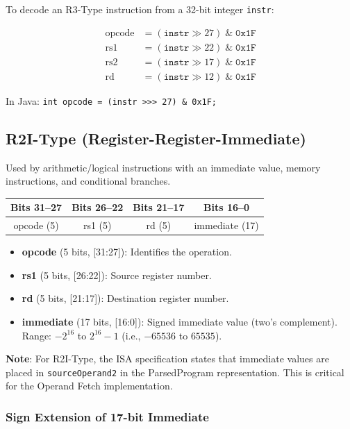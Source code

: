 \documentclass[12pt,a4paper]{article}
\begin{document}
To decode an R3-Type instruction from a 32-bit integer \texttt{instr}:

\begin{align}
\text{opcode} &= (\texttt{instr} \gg 27) \;\&\; \texttt{0x1F} \\
\text{rs1} &= (\texttt{instr} \gg 22) \;\&\; \texttt{0x1F} \\
\text{rs2} &= (\texttt{instr} \gg 17) \;\&\; \texttt{0x1F} \\
\text{rd} &= (\texttt{instr} \gg 12) \;\&\; \texttt{0x1F}
\end{align}

In Java: \texttt{int opcode = (instr >>> 27) \& 0x1F;}

\subsection{R2I-Type (Register-Register-Immediate)}

Used by arithmetic/logical instructions with an immediate value, memory instructions, and conditional branches.

\begin{center}
\begin{tabular}{|c|c|c|c|}
\hline
\textbf{Bits 31--27} & \textbf{Bits 26--22} & \textbf{Bits 21--17} & \textbf{Bits 16--0} \\
\hline
opcode (5) & rs1 (5) & rd (5) & immediate (17) \\
\hline
\end{tabular}
\end{center}

\begin{itemize}
    \item \textbf{opcode} (5 bits, [31:27]): Identifies the operation.
    \item \textbf{rs1} (5 bits, [26:22]): Source register number.
    \item \textbf{rd} (5 bits, [21:17]): Destination register number.
    \item \textbf{immediate} (17 bits, [16:0]): Signed immediate value (two's complement). Range: $-2^{16}$ to $2^{16} - 1$ (i.e., $-65536$ to $65535$).
\end{itemize}

\textbf{Note}: For R2I-Type, the ISA specification states that immediate values are placed in \texttt{sourceOperand2} in the ParsedProgram representation. This is critical for the Operand Fetch implementation.

\subsubsection{Sign Extension of 17-bit Immediate}
\end{document}
